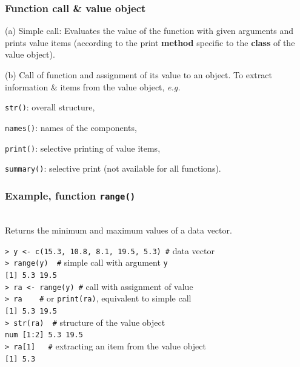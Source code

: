 \documentclass[handout,12pt]{beamer}
\begin{document}
\begin{frame}\frametitle{Function call \& value object}
\bi
\item[(a)]
Simple call: Evaluates the value of the function with given arguments
and prints value items (according to  the print \textbf{method} specific to
  the \textbf{class} of the value object).
  \medskip
\item[(b)] Call of function and assignment of its value to an object.
\ei    
To extract information \& items from the value object, \emph{e.g.} 
\bi
\item {\tt str()}: overall structure,
\item {\tt names()}: names of the components,
\item {\tt print()}: selective printing of value items,
\item {\tt summary()}: selective print (not available for all functions).
\ei

\end{frame} 


\begin{frame}\frametitle{Example, function {\tt range()}}
\ \\
Returns the minimum and maximum values
of a data vector.

{\tt > y <- c(15.3, 10.8, 8.1, 19.5, 5.3)  \#} data vector \\
\medskip
{\tt > range(y) \ \#} simple call with argument {\tt y}\\
{\tt [1]  5.3 19.5}\\
\medskip
{\tt > ra <- range(y) \#} call with assignment of value\\ 
\medskip
{\tt > ra \ \ \   \#} or {\tt print(ra)}, equivalent to simple call\\
{\tt [1]  5.3 19.5}\\
\medskip
{\tt > str(ra) \   \#} structure of the value object\\
{\tt num [1:2] 5.3 19.5}\\
\medskip
{\tt > ra[1]  \ \ \#} extracting an item from the value object\\
{\tt [1] 5.3}
\end{frame} 



\end{document}
